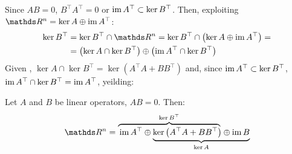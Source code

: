 Since \( A B = 0\), \( B^\top A^\top = 0 \) or \( \operatorname{im} A^\top \subset \ker B^\top \). Then, exploiting \( \ds R^n = \ker A \oplus \im A^\top \): 
\begin{equation}
      \begin{aligned}
            \ker B^\top & = \ker B^\top \cap \ds R^n = \ker B^\top \cap \left( \ker A \oplus \im A^\top \right) = \\
            & = \left( \ker A \cap \ker B^\top \right) \oplus \left( \im A^\top \cap \ker B^\top \right)
      \end{aligned}
\end{equation}
Given , \( \ker A \cap \ker B^\top = \ker \left(  A^\top A + B B^\top \right) \) and, since \( \operatorname{im} A^\top \subset \ker B^\top \), \( \operatorname{im} A^\top \cap \ker B^\top = \operatorname{im} A^\top \), yeilding:
\begin{theorem}\label{thm:hodge_decomposition}
      Let \( A \) and \( B \) be linear operators, \( A B = 0 \). Then:
      \begin{equation}
            \ds R^n = \lefteqn{\overbrace{\phantom{\im A^\top \oplus  \ker \left( A^\top A + B B^\top \right)}}^{\ker B^\top}} \im A^\top \oplus
            \underbrace{\ker \left( A^\top A + B B^\top \right) \oplus  \im B}_{\ker A}
      \end{equation}
      \vspace{-\baselineskip}
\end{theorem}